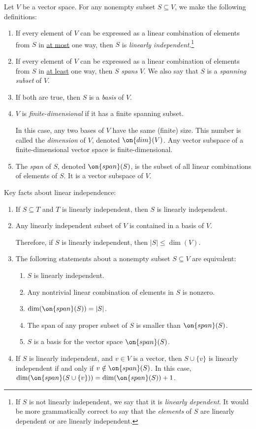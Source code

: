 \documentclass[10pt]{amsart}
\theoremstyle{mythm}
\theoremstyle{definition}
\theoremstyle{myrmk}
\newcounter{part-count}
\newenvironment{me}{\begin{enumerate}\setcounter{enumi}{\value{part-count}}}{\setcounter{part-count}{\value{enumi}}\end{enumerate}}
\begin{document}
	\thispagestyle{fancy}

	Let $V$ be a vector space. For any nonempty subset $S \subseteq V$, we make the following definitions: 
	\begin{me}
		\item If every element of $V$ can be expressed as a linear combination of elements from $S$ in \underline{at most} one way, then $S$ is \emph{linearly independent}.\footnote{If $S$ is not linearly independent, we say that it is \emph{linearly dependent}. It would be more grammatically correct to say that the \emph{elements} of $S$ are linearly dependent or are linearly independent.} 
		\item If every element of $V$ can be expressed as a linear combination of elements from $S$ in \underline{at least} one way, then $S$ \emph{spans} $V$. We also say that $S$ is a \emph{spanning subset} of $V$. 
		\item \label{3} If both are true, then $S$ is a \emph{basis} of $V$. 
		\item $V$ is \emph{finite-dimensional} if it has a finite spanning subset. 
		
		In this case, any two bases of $V$ have the same (finite) size. This number is called the \emph{dimension} of $V$, denoted $\on{dim}(V)$. Any vector subspace of a finite-dimensional vector space is finite-dimensional. 
		\item The \emph{span} of $S$, denoted $\on{span}(S)$, is the subset of all linear combinations of elements of $S$. It is a vector subspace of $V$. 
	\end{me}
	Key facts about linear independence: 
	\begin{me}
		\item If $S \subseteq T$ and $T$ is linearly independent, then $S$ is linearly independent. 
		\item Any linearly independent subset of $V$ is contained in a basis of $V$. 
		\label{99} 
		
		Therefore, if $S$ is linearly independent, then $|S| \le \dim(V)$. 
		\item \label{9} The following statements about a nonempty subset $S \subseteq V$ are equivalent:  
		\begin{enumerate}[label=(\alph*)]
			\item $S$ is linearly independent. 
			\item Any nontrivial linear combination of elements in $S$ is nonzero. 
			\item $\dim(\on{span}(S)) = |S|$. 
			\item The span of any proper subset of $S$ is smaller than $\on{span}(S)$. 
			\item $S$ is a basis for the vector space $\on{span}(S)$. 
		\end{enumerate}
		\item If $S$ is linearly independent, and $v \in V$ is a vector, then $S \cup \{v\}$ is linearly independent if and only if $v \notin \on{span}(S)$. In this case, $\dim(\on{span}(S \cup \{v\})) = \dim(\on{span}(S)) +1$. 
	\end{me}
\end{document}
